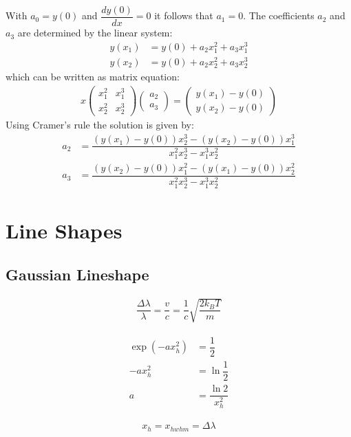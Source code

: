 With $a_0 = y(0)$ and $\dfrac{d y(0)}{d x} = 0$ it follows that $a_1 = 0$.
The coefficients $a_2$ and $a_3$ are determined by the linear system: 
\begin{align}
	y(x_1) &= y(0) + a_2 x_1^2 +  a_3 x_1^3 \\
	y(x_2) &= y(0) + a_2 x_2^2 +  a_3 x_2^3
\end{align}
which can be written as matrix equation:
\begin{align}x
	\begin{pmatrix} x_1^2 & x_1^3 \\
					x_2^2 & x_2^3 
	\end{pmatrix}
	\begin{pmatrix}	a_2 \\ a_3
	\end{pmatrix}
	=
	\begin{pmatrix} y(x_1) - y(0) \\ y(x_2) - y(0)
	\end{pmatrix}
\end{align}
Using Cramer's rule the solution is given by:
\begin{align}
 a_2 &= \dfrac{(y(x_1) - y(0)) x_2^3 - (y(x_2) - y(0)) x_1^3}{x_1^2 x_2^3 - x_1^3 x_2^2} \\
 a_3 &= \dfrac{(y(x_2) - y(0)) x_1^2 - (y(x_1) - y(0)) x_2^2}{x_1^2 x_2^3 - x_1^3 x_2^2}
\end{align}

\section{Line Shapes}

\subsection{Gaussian Lineshape}

\begin{align}
	\dfrac{\Delta \lambda}{\lambda} = \dfrac{v}{c} = \dfrac{1}{c} \sqrt{\dfrac{2 k_B T}{m}}
\end{align}

\begin{align}
	\exp(-a x_h^2) &= \dfrac{1}{2} \\
	-a x_h^2 &= \ln{\dfrac{1}{2}} \\
	a &= \dfrac{\ln{2}}{x_h^2}
\end{align}

\begin{align}
	x_h = x_{hwhm} = \Delta \lambda
\end{align}


